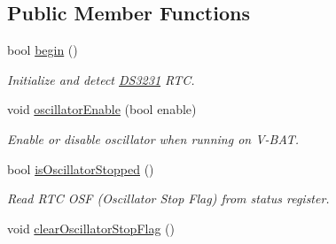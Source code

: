 \subsection*{Public Member Functions}
\begin{DoxyCompactItemize}
\item 
bool \hyperlink{class_d_s3231_ac7274a84831c60fe1df1598c47dfb614}{begin} ()
\begin{DoxyCompactList}\small\item\em Initialize and detect \hyperlink{class_d_s3231}{D\+S3231} R\+TC. \end{DoxyCompactList}\item 
void \hyperlink{class_d_s3231_adb2265225b415564a593d8dc5452ba96}{oscillator\+Enable} (bool enable)
\begin{DoxyCompactList}\small\item\em Enable or disable oscillator when running on V-\/\+B\+AT. \end{DoxyCompactList}\item 
bool \hyperlink{class_d_s3231_a1bc59796227778857b5f9978d096b6fd}{is\+Oscillator\+Stopped} ()
\begin{DoxyCompactList}\small\item\em Read R\+TC O\+SF (Oscillator Stop Flag) from status register. \end{DoxyCompactList}\item 
void \hyperlink{class_d_s3231_a380b72e98c720380145039995f22fa0e}{clear\+Oscillator\+Stop\+Flag} ()\hypertarget{class_d_s3231_a380b72e98c720380145039995f22fa0e}{}\label{class_d_s3231_a380b72e98c720380145039995f22fa0e}


\end{DoxyCompactItemize}
